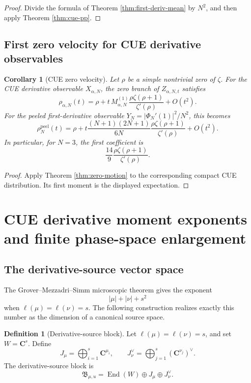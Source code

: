 \documentclass[11pt]{article}
\newcommand{\C}{\mathbf C}
\newcommand{\End}{\operatorname{End}}
\theoremstyle{plain}
\newtheorem{corollary}[theorem]{Corollary}
\theoremstyle{definition}
\newtheorem{definition}[theorem]{Definition}
\begin{document}
\begin{proof}
Divide the formula of Theorem \ref{thm:first-deriv-mean} by \(N^2\), and then apply Theorem \ref{thm:cue-pp}.
\end{proof}

\subsection{First zero velocity for CUE derivative observables}

\begin{corollary}[CUE zero velocity]\label{cor:cue-zero-velocity}
Let \(\rho\) be a simple nontrivial zero of \(\zeta\).  For the CUE derivative observable \(X_{\alpha,N}\), the zero branch of \(Z_{\alpha,N,t}\) satisfies
\[
   \rho_{\alpha,N}(t)=\rho+
   t\,M_{\alpha,N}^{(1)}\frac{\rho\zeta(\rho+1)}{\zeta'(\rho)}+O(t^2).
\]
For the peeled first-derivative observable \(Y_N=|\Phi_N'(1)|^2/N^2\), this becomes
\[
   \rho_N^{\operatorname{peel}}(t)=\rho+
   t\frac{(N+1)(2N+1)}{6N}\frac{\rho\zeta(\rho+1)}{\zeta'(\rho)}+O(t^2).
\]
In particular, for \(N=3\), the first coefficient is
\[
   \frac{14}{9}\frac{\rho\zeta(\rho+1)}{\zeta'(\rho)}.
\]
\end{corollary}

\begin{proof}
Apply Theorem \ref{thm:zero-motion} to the corresponding compact CUE distribution.  Its first moment is the displayed expectation.
\end{proof}

\section{CUE derivative moment exponents and finite phase-space enlargement}

\subsection{The derivative-source vector space}

The Grover--Mezzadri--Simm microscopic theorem gives the exponent
\[
   |\mu|+|\nu|+s^2
\]
when \(\ell(\mu)=\ell(\nu)=s\).  The following construction realizes exactly this number as the dimension of a canonical source space.

\begin{definition}[Derivative-source block]\label{def:source-block}
Let \(\ell(\mu)=\ell(\nu)=s\), and set \(W=\C^s\).  Define
\[
   J_\mu=\bigoplus_{i=1}^s\C^{\mu_i},
   \qquad
   J_\nu^\vee=\bigoplus_{j=1}^s(\C^{\nu_j})^\vee.
\]
The derivative-source block is
\[
   \mathfrak B_{\mu,
u}=\End(W)\oplus J_\mu\oplus J_\nu^\vee.
\]
\end{definition}
\end{document}
